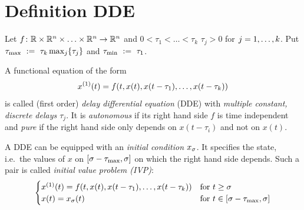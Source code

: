 

\section{Definition DDE}
    \label{sec:definition-dde}


    \cite{Roussel04DDEs}

    \begin{definition}\label{def:dde}
        Let $f\colon\mathbb{R}\times\mathbb{R}^n\times\ldots\times\mathbb{R}^n\to\mathbb{R}^n$ and $0<\tau_1<\ldots<\tau_k$ $\tau_j > 0$ for $j=1,\ldots,k$. Put $\taumax\defeq\tau_k\max_j\set{\tau_j}$ and $\tau_{\min}~\mathrel{\mathop{:}}=~\tau_1$.

        A functional equation of the form
        \begin{equation}\label{eq:dde}
            \D{x}(t) = f(t,x(t),x(t-\tau_1),\ldots,x(t-\tau_k))
        \end{equation}
        is called (first order) \emph{delay differential equation} (DDE) with \emph{multiple constant, discrete delays $\tau_j$}.
        It is \emph{autonomous} if its right hand side $f$ is time independent and \emph{pure} if the right hand side only depends on $x(t-\tau_i)$ and not on $x(t)$.

        A DDE can be equipped with an \emph{initial condition} $x_{\sigma}$. It specifies the state, i.e.\ the values of $x$ on $[\sigma-\tau_{\max}, \sigma]$ on which the right hand side depends.
        Such a pair is called \emph{initial value problem (IVP)}:
        \begin{equation}\label{eq:ivp}
            \begin{cases}
                \D{x}(t) = f(t,x(t),x(t-\tau_1),\ldots,x(t-\tau_k)) & \text{for } t\geq\tzero\\
                x(t) = x_{\tzero}(t) & \text{for } t\in [\tzero-\taumax,\tzero]
            \end{cases}
        \end{equation}
    \end{definition}

